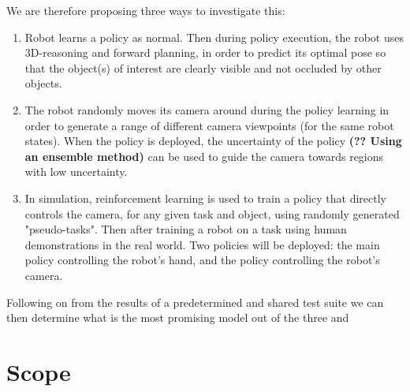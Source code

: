     We are therefore proposing three ways to investigate this:
    \begin{enumerate}
        \item Robot learns a policy as normal. Then during policy execution, the robot uses 3D-reasoning and forward planning, in order to predict its optimal pose so that the object(s) of interest are clearly visible and not occluded by other objects.
        \item The robot randomly moves its camera around during the policy learning in order to generate a range of different camera viewpoints (for the same robot states). When the policy is deployed, the uncertainty of the policy \textbf{(?? Using an ensemble method)} can be used to guide the camera towards regions with low uncertainty.
        \item In simulation, reinforcement learning is used to train a policy that directly controls the camera, for any given task and object, using randomly generated "pseudo-tasks". Then after training a robot on a task using human demonstrations in the real world. Two policies will be deployed: the main policy controlling the robot's hand, and the policy controlling the robot's camera.
    \end{enumerate}

    Following on from the results of a predetermined and shared test suite we can then determine what is the most promising model out of the three and 
\section{Scope} %

